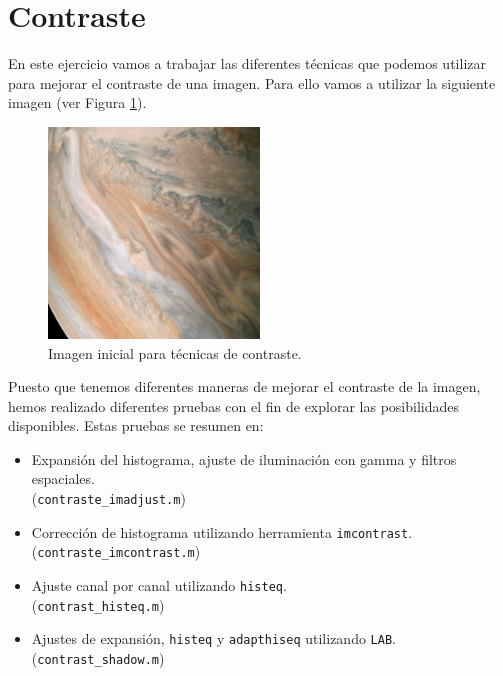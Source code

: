 \documentclass[12pt]{article}
\begin{document}
	\pagebreak
	
	\section{Contraste}
	\noindent En este ejercicio vamos a trabajar las diferentes técnicas que podemos utilizar para mejorar el contraste de una imagen. Para ello vamos a utilizar la siguiente imagen (ver Figura \ref{img: contraste src}).
	
	\begin{figure}[h]
		\begin{center}
			\includegraphics[width=0.5\textwidth]{img/contraste.jpg}
			\caption{Imagen inicial para técnicas de contraste.}
			\label{img: contraste src}
		\end{center}
	\end{figure}

	\noindent Puesto que tenemos diferentes maneras de mejorar el contraste de la imagen, hemos realizado diferentes pruebas con el fin de explorar las posibilidades disponibles. Estas pruebas se resumen en:
	\begin{itemize}
		\item Expansión del histograma, ajuste de iluminación con gamma y filtros espaciales.\\ (\texttt{contraste\_imadjust.m})
		\item Corrección de histograma utilizando herramienta \texttt{imcontrast}.\\
		(\texttt{contraste\_imcontrast.m})
		\item Ajuste canal por canal utilizando \texttt{histeq}.\\
		(\texttt{contrast\_histeq.m})
		\item Ajustes de expansión, \texttt{histeq} y \texttt{adapthiseq} utilizando \texttt{LAB}.\\
		(\texttt{contrast\_shadow.m})
	\end{itemize}
\end{document}
